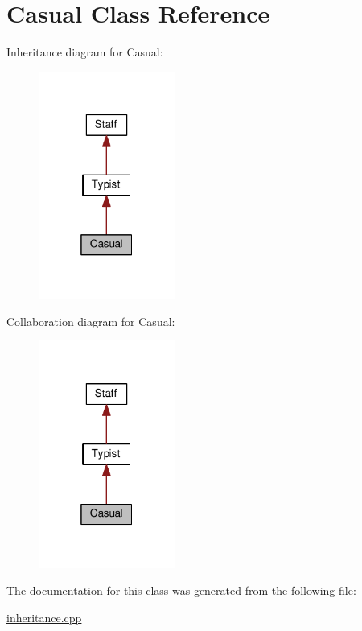 \hypertarget{class_casual}{}\section{Casual Class Reference}
\label{class_casual}


Inheritance diagram for Casual\+:
\nopagebreak
\begin{figure}[H]
\begin{center}
\leavevmode
\includegraphics[width=127pt]{class_casual__inherit__graph}
\end{center}
\end{figure}


Collaboration diagram for Casual\+:
\nopagebreak
\begin{figure}[H]
\begin{center}
\leavevmode
\includegraphics[width=127pt]{class_casual__coll__graph}
\end{center}
\end{figure}


The documentation for this class was generated from the following file\+:\begin{DoxyCompactItemize}
\item 
\hyperlink{inheritance_8cpp}{inheritance.\+cpp}\end{DoxyCompactItemize}

